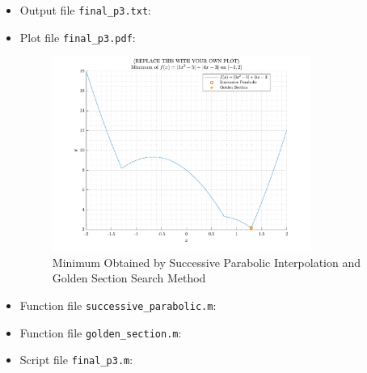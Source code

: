 \begin{solution}
  \quad
  \begin{itemize}
    \item Output file \verb|final_p3.txt|:
      
    \item Plot file \verb|final_p3.pdf|:
      \begin{figure}[!hbtp]
        \centering
        \includegraphics[width=0.8\textwidth]{../src/final_p3.pdf}
        \caption{Minimum Obtained by Successive Parabolic Interpolation and Golden Section Search Method}
        \label{fig:}
      \end{figure}
    \item Function file \verb|successive_parabolic.m|:
      
    \item Function file \verb|golden_section.m|:
      
    \item Script file \verb|final_p3.m|:
      
  \end{itemize}
\end{solution}

